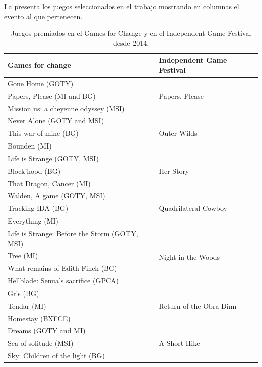 \documentclass[spanish]{textolivre}
\begin{document}
La  presenta los juegos seleccionados en el trabajo mostrando en columnas el evento al que pertenecen.


\begin{table}[h!]
\centering
\begin{threeparttable}
\caption{Juegos premiados en el Games for Change y en el Independent Game Festival desde 2014.}
\label{tab01}
\begin{tabular}{ll}
\toprule
Games for change &
Independent Game Festival \\ 
\midrule

Gone Home (GOTY) & \multirow{3}{*}{Papers, Please} \\
Papers, Please (MI and BG) & \\
Mission us: a cheyenne odyssey (MSI) & \\
\midrule

Never Alone (GOTY and MSI) & \multirow{3}{*}{Outer Wilds}\\ 
This war of mine (BG) & \\ 
Bounden	(MI) & \\
\midrule

Life is Strange (GOTY, MSI)	& \multirow{3}{*}{Her Story}\\ 
Block’hood (BG) & \\ 
That Dragon, Cancer (MI) & \\
\midrule

Walden, A game (GOTY, MSI) & \multirow{3}{*}{Quadrilateral Cowboy}\\
Tracking IDA (BG) & \\ 
Everything (MI) & \\
\midrule

Life is Strange: Before the Storm (GOTY, MSI) & \multirow{4}{*}{Night in the Woods}\\
Tree (MI) & \\
What remains of Edith Finch (BG) & \\ 
Hellblade: Senua’s sacrifice (GPCA) & \\
\midrule

Gris (BG) & \multirow{3}{*}{Return of the Obra Dinn}\\
Tendar (MI) & \\ 
Homestay (BXFCE) & \\
\midrule

Dreams (GOTY and MI) & \multirow{3}{*}{A Short Hike}\\ 
Sea of solitude (MSI) & \\ 
Sky: Children of the light (BG) & \\
\midrule


\end{tabular}
\end{threeparttable}
\end{table}
\end{document}
